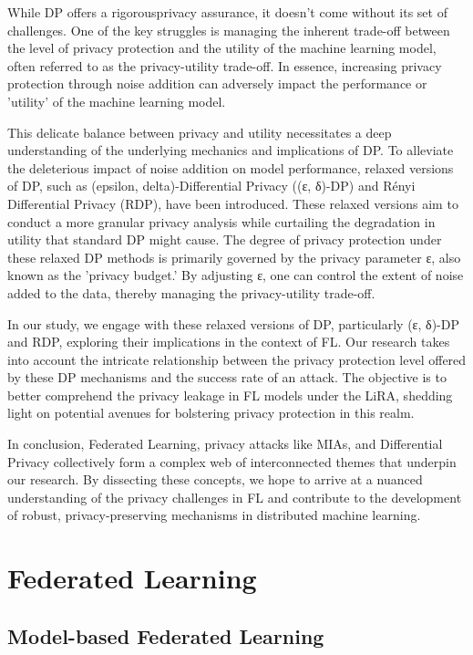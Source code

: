 While DP offers a rigorousprivacy assurance, it doesn't come without its set of challenges. One of the key struggles is managing the inherent trade-off between the level of privacy protection and the utility of the machine learning model, often referred to as the privacy-utility trade-off. In essence, increasing privacy protection through noise addition can adversely impact the performance or 'utility' of the machine learning model.

This delicate balance between privacy and utility necessitates a deep understanding of the underlying mechanics and implications of DP. To alleviate the deleterious impact of noise addition on model performance, relaxed versions of DP, such as (epsilon, delta)-Differential Privacy ((ε, δ)-DP) and Rényi Differential Privacy (RDP), have been introduced. These relaxed versions aim to conduct a more granular privacy analysis while curtailing the degradation in utility that standard DP might cause. The degree of privacy protection under these relaxed DP methods is primarily governed by the privacy parameter ε, also known as the 'privacy budget.' By adjusting ε, one can control the extent of noise added to the data, thereby managing the privacy-utility trade-off.

In our study, we engage with these relaxed versions of DP, particularly (ε, δ)-DP and RDP, exploring their implications in the context of FL. Our research takes into account the intricate relationship between the privacy protection level offered by these DP mechanisms and the success rate of an attack. The objective is to better comprehend the privacy leakage in FL models under the LiRA, shedding light on potential avenues for bolstering privacy protection in this realm.

In conclusion, Federated Learning, privacy attacks like MIAs, and Differential Privacy collectively form a complex web of interconnected themes that underpin our research. By dissecting these concepts, we hope to arrive at a nuanced understanding of the privacy challenges in FL and contribute to the development of robust, privacy-preserving mechanisms in distributed machine learning.


\section{Federated Learning}
\label{sec:fl}
\subsection{Model-based Federated Learning}

